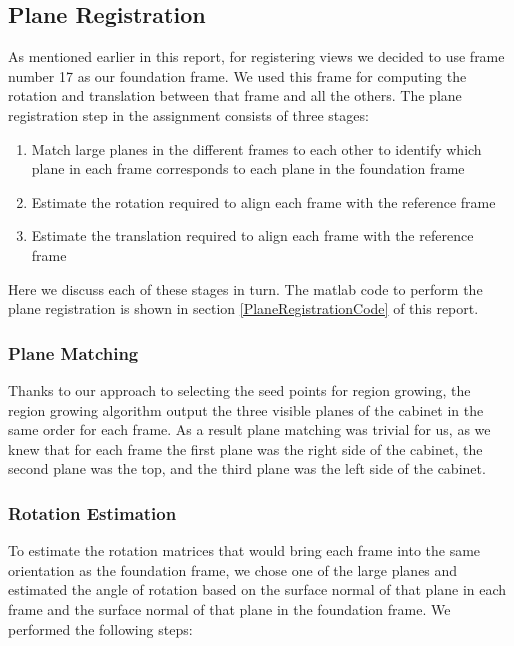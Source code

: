 \subsection{Plane Registration}

As mentioned earlier in this report, for registering views we decided to use frame number 17 as our foundation frame. We used this frame for computing the rotation and translation between that frame and all the others. The plane registration step in the assignment consists of three stages:

\begin{enumerate}
	\item Match large planes in the different frames to each other to identify which plane in each frame corresponds to each plane in the foundation frame
	\item Estimate the rotation required to align each frame with the reference frame
	\item Estimate the translation required to align each frame with the reference frame 
\end{enumerate}

Here we discuss each of these stages in turn. The matlab code to perform the plane registration is shown in section \ref{PlaneRegistrationCode} of this report.

\subsubsection{Plane Matching}

Thanks to our approach to selecting the seed points for region growing, the region growing algorithm output the three visible planes of the cabinet in the same order for each frame. As a result plane matching was trivial for us, as we knew that for each frame the first plane was the right side of the cabinet, the second plane was the top, and the third plane was the left side of the cabinet.

\subsubsection{Rotation Estimation}

To estimate the rotation matrices that would bring each frame into the same orientation as the foundation frame, we chose one of the large planes and estimated the angle of rotation based on the surface normal of that plane in each frame and the surface normal of that plane in the foundation frame. We performed the following steps:

